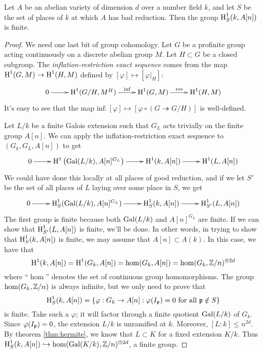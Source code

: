 \documentclass{article}
\begin{document}
\begin{theorem}
Let $A$ be an abelian variety of dimension $d$ over a number field $k$, and let 
$S$ be the set of places of $k$ at which $A$ has bad reduction. Then the group 
$\operatorname{H}_S^1(k,A[n])$ is finite.
\end{theorem}
\begin{proof}
We need one last bit of group cohomology. Let $G$ be a profinite group acting 
continuously on a discrete abelian group $M$. Let $H\subset G$ be a closed 
subgroup. The \emph{inflation-restriction exact sequence} comes from the 
map $\operatorname{H}^1(G,M) \to \operatorname{H}^1(H,M)$ defined by $[\varphi]\mapsto [\varphi|_H]$: 
\[\xymatrix{
  0 \ar[r] 
    & \h^1(G/H,M^H) \ar[r]^-{\text{inf}} 
    & \h^1(G,M) \ar[r]^-{\text{res}}
    & \h^1(H,M)
}\]
It's easy to see that the map 
$\text{inf}:[\varphi]\mapsto [\varphi\circ (G\twoheadrightarrow G/H)]$ is 
well-defined. 

Let $L/k$ be a finite Galois extension such that $G_L$ acts trivially on the 
finite group $A[n]$. We can apply the inflation-restriction exact sequence to 
$(G_k,G_L,A[n])$ to get 
\[\xymatrix{
  0 \ar[r] 
    & \h^1\left(\gal(L/k), A[n]^{G_L}\right) \ar[r] 
    & \h^1(k,A[n]) \ar[r] 
    & \h^1(L,A[n])
}\]
We could have done this locally at all places of good reduction, and if we let 
$S'$ be the set of all places of $L$ laying over some place in $S$, we get 
\[\xymatrix{
  0 \ar[r] 
    & \h_S^1(\gal(L/k),A[n]^{G_L}) \ar[r] 
    & \h_S^1(k,A[n]) \ar[r]
    & \h_{S'}^1(L,A[n])
}\]
The first group is finite because both $\operatorname{Gal}(L/k)$ and $A[n]^{G_L}$ are finite. 
If we can show that $\operatorname{H}_{S'}^1(L,A[n])$ is finite, we'll be done. In other 
words, in trying to show that $\operatorname{H}_S^1(k,A[n])$ is finite, we may assume that 
$A[n]\subset A(k)$. In this case, we have that 
\[
  \operatorname{H}^1(k,A[n]) = \operatorname{H}^1(G_k,A[n]) = \hom(G_k,A[n]) = \hom(G_k,\mathbb{Z}/n)^{\oplus 2d}
\]
where ``$\hom$'' denotes the set of continuous group homomorphisms. The group 
$\hom(G_k,\mathbb{Z}/n)$ is always infinite, but we only need to prove that 
\[
  \operatorname{H}_S^1(k,A[n]) = \{\varphi:G_k\to A[n] : \varphi(I_{\mathfrak{p}}) = 0\text{ for all }\mathfrak{p}\notin S\}
\]
is finite. Take such a $\varphi$; it will factor through a finite quotient 
$\operatorname{Gal}(L/k)$ of $G_k$. Since $\varphi(I_{\mathfrak{p}})=0$, the extension $L/k$ is 
unramified at $k$. Moreover, $[L:k]\leqslant n^{2 d}$. By theorem 
\ref{thm:hermite}, we know that $L\subset K$ for a fixed extension $K/k$. 
Thus $\operatorname{H}_S^1(k,A[n])\hookrightarrow \hom(\operatorname{Gal}(K/k),\mathbb{Z}/n)^{\oplus 2d}$, a  
finite group. 
\end{proof}
\end{document}
